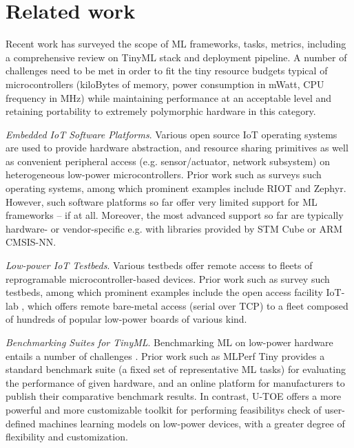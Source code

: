 \section{Related work}
Recent work has surveyed \cite{saha2022tinyml-review} the scope of ML frameworks, tasks, metrics, including a comprehensive review on TinyML stack and deployment pipeline. A number of challenges need to be met in order to fit the tiny resource budgets typical of microcontrollers (kiloBytes of memory, power consumption in mWatt, CPU frequency in MHz) while maintaining performance at an acceptable level and retaining portability to extremely polymorphic hardware in this category.

\emph{Embedded IoT Software Platforms}.
Various open source IoT operating systems are used to provide hardware abstraction, and resource sharing primitives as well as convenient peripheral access (e.g. sensor/actuator, network subsystem) on heterogeneous low-power microcontrollers. Prior work such as \cite{hahm2015operating} surveys such operating systems, among which prominent examples include RIOT\cite{baccelli2018riot} and Zephyr\cite{zephyr}. However, such software platforms so far offer very limited support for ML frameworks -- if at all. Moreover, the most advanced support so far are typically hardware- or vendor-specific e.g. with libraries provided by STM Cube or ARM CMSIS-NN.

\emph{Low-power IoT Testbeds}. Various testbeds offer remote access to fleets of reprogramable microcontroller-based devices. Prior work such as \cite{lima2019testbeds,mitton2011testbeds} survey such testbeds, among which prominent examples include the open access facility IoT-lab \cite{adjih2015iot-lab}, which offers remote bare-metal access (serial over TCP) to a fleet composed of hundreds of popular low-power boards of various kind.
 
 \emph{Benchmarking Suites for TinyML}.
Benchmarking ML on low-power hardware entails a number of challenges \cite{banbury2020benchmarking}. Prior work such as MLPerf Tiny \cite{banbury2021mlperf} provides a standard benchmark suite (a fixed set of representative ML tasks) for evaluating the performance of given hardware, and an online platform for manufacturers to publish their comparative benchmark results. 
In contrast, U-TOE offers a more powerful and more customizable toolkit for performing feasibilitys check of user-defined machines learning models on low-power devices, with a greater degree of flexibility and customization.
 
